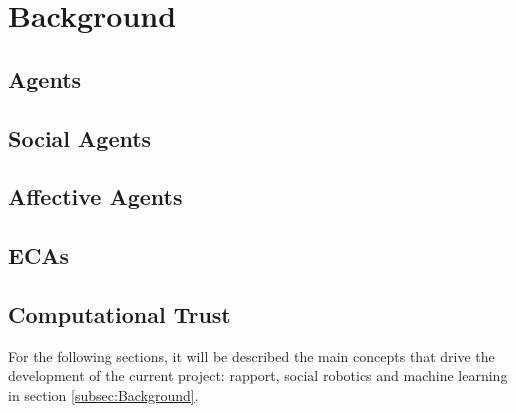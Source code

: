 \section{Background}
\label{sec:Background}




\subsection{Agents}

\subsection{Social Agents} %
\subsection{Affective Agents}
\subsection{\ac{ECAs}}

\subsection{Computational Trust}

For the following sections, it will be described the main concepts that drive the development of the current project: rapport, social robotics and machine learning in section \ref{subsec:Background}.